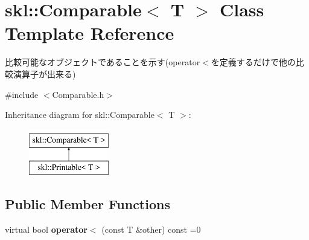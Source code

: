 \hypertarget{classskl_1_1_comparable}{}\section{skl\+:\+:Comparable$<$ T $>$ Class Template Reference}
\label{classskl_1_1_comparable}


比較可能なオブジェクトであることを示す(operator$<$を定義するだけで他の比較演算子が出来る)  




{\ttfamily \#include $<$Comparable.\+h$>$}

Inheritance diagram for skl\+:\+:Comparable$<$ T $>$\+:\begin{figure}[H]
\begin{center}
\leavevmode
\includegraphics[height=2.000000cm]{classskl_1_1_comparable}
\end{center}
\end{figure}
\subsection*{Public Member Functions}
\begin{DoxyCompactItemize}
\item 
\hypertarget{classskl_1_1_comparable_a08ded8ee95f5d2453106761b984dad50}{}\label{classskl_1_1_comparable_a08ded8ee95f5d2453106761b984dad50} 
virtual bool {\bfseries operator$<$} (const T \&other) const =0
\end{DoxyCompactItemize}
